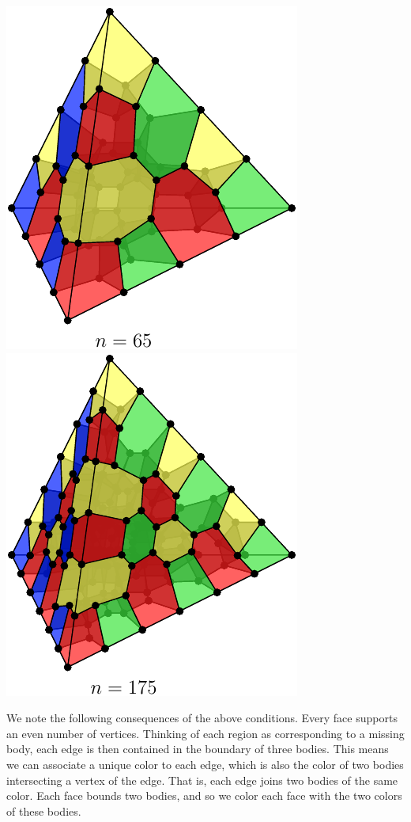 \documentclass[a4paper,onecolumn,11pt,unpublished]{quantumarticle}
\begin{document}
\begin{center}
\includegraphics{pic-gcolor-2.pdf}\ \ \ \ \ \ \ \ \ \   \includegraphics{pic-gcolor-3.pdf}
\end{center}

We note the following consequences of the above conditions.
Every face supports an even number of vertices.
Thinking of each region as corresponding to a missing body,
each edge is then contained in the boundary of three bodies.
This means we can associate a unique color to each edge,
which is also the color of two bodies intersecting a vertex of the edge.
That is, each edge joins two bodies of the same color.
Each face bounds two bodies, and so we color each face with the two colors of these bodies.
\end{document}

